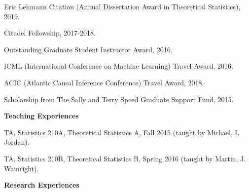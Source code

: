 \documentclass{article}
\begin{document}
\vspace{5mm}

Eric Lehmann Citation (Annual Dissertation Award in Theoretical Statistics), 2019.

\vspace{2mm}

Citadel Fellowship, 2017-2018.

\vspace{2mm}

Outstanding Graduate Student Instructor Award, 2016.

\vspace{2mm}
ICML (International Conference on Machine Learning) Travel Award, 2016.

\vspace{2mm}
ACIC (Atlantic Causal Inference Conference) Travel Award, 2018.

\vspace{2mm}
Scholarship from The Sally and Terry Speed Graduate Support Fund, 2015.

\vspace{5mm}
\begin{large}
\noindent \textbf{Teaching Experiences}
\end{large}
\vspace{5mm}

TA, Statistics 210A, Theoretical Statistics A, Fall 2015 (taught by Michael, I. Jordan). 



\vspace{2mm}
TA, Statistics 210B, Theoretical Statistics B, Spring 2016 (taught by Martin, J. Wainright). 




\vspace{5mm}
\begin{large}
\noindent \textbf{Research Experiences}
\end{large}
\vspace{5mm}
\end{document}
